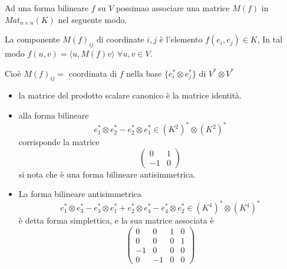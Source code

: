 \documentclass[../main.tex]{subfiles}
\begin{document}
Ad una forma bilineare $f$ su $V$ possimao associare una matrice $M(f)$ in $Mat_{n \times n}(K)$ nel seguente modo.

La componente $M(f)_{ij}$ di coordinate $i, j$ è l'elemento $f(e_i, e_j) \in K$, In tal modo $f(u, v) = \langle u, M(f)v\rangle$ $\forall u, v \in V$.

Cioè $M(f)_{ij} =$ coordinata di $f$ nella base $\{e_i^* \otimes e_j^*\}$ di $V^* \otimes V^*$

\begin{example}
    \begin{itemize}
        \item la matrice del prodotto scalare canonico è la matrice identità.
        \item alla forma bilineare
              \begin{equation*}
                  e_1^* \otimes e_2^* - e_2^* \otimes e_1^* \in (K^2)^* \otimes (K^2)^*
              \end{equation*}
              corrisponde la matrice
              \begin{equation*}
                  \begin{pmatrix}
                      0  & 1 \\
                      -1 & 0
                  \end{pmatrix}
              \end{equation*}
              si nota che è una forma bilineare antisimmetrica.
        \item La forma bilineare antisimmetrica
              \begin{equation*}
                  e_1^* \otimes e_3^* - e_3^* \otimes e_1^* + e_2^* \otimes e_4^* - e_4^* \otimes e_2^* \in (K^4)^* \otimes (K^4)^*
              \end{equation*}
              è detta forma simplettica, e la sua matrice associata è
              \begin{equation*}
                  \begin{pmatrix}
                      0  & 0  & 1 & 0 \\
                      0  & 0  & 0 & 1 \\
                      -1 & 0  & 0 & 0 \\
                      0  & -1 & 0 & 0
                  \end{pmatrix}
              \end{equation*}
    \end{itemize}
\end{example}
\end{document}

